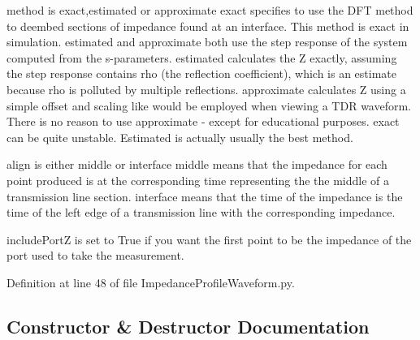 method is \textquotesingle{}exact\textquotesingle{},\textquotesingle{}estimated\textquotesingle{} or \textquotesingle{}approximate\textquotesingle{} \textquotesingle{}exact\textquotesingle{} specifies to use the D\+FT method to deembed sections of impedance found at an interface. This method is exact in simulation. \textquotesingle{}estimated\textquotesingle{} and \textquotesingle{}approximate\textquotesingle{} both use the step response of the system computed from the s-\/parameters. \textquotesingle{}estimated\textquotesingle{} calculates the Z exactly, assuming the step response contains rho (the reflection coefficient), which is an estimate because rho is polluted by multiple reflections. \textquotesingle{}approximate\textquotesingle{} calculates Z using a simple offset and scaling like would be employed when viewing a T\+DR waveform. There is no reason to use \textquotesingle{}approximate\textquotesingle{} -\/ except for educational purposes. \textquotesingle{}exact\textquotesingle{} can be quite unstable. \textquotesingle{}Estimated\textquotesingle{} is actually usually the best method.

align is either \textquotesingle{}middle\textquotesingle{} or \textquotesingle{}interface\textquotesingle{} \textquotesingle{}middle\textquotesingle{} means that the impedance for each point produced is at the corresponding time representing the the middle of a transmission line section. \textquotesingle{}interface\textquotesingle{} means that the time of the impedance is the time of the left edge of a transmission line with the corresponding impedance.

include\+PortZ is set to True if you want the first point to be the impedance of the port used to take the measurement. 

Definition at line 48 of file Impedance\+Profile\+Waveform.\+py.



\subsection{Constructor \& Destructor Documentation}
\mbox{\label{classSignalIntegrity_1_1ImpedanceProfile_1_1ImpedanceProfileWaveform_1_1ImpedanceProfileWaveform_a44c18ce4afb30f11f4cdb07bc0f0c6be}} 
